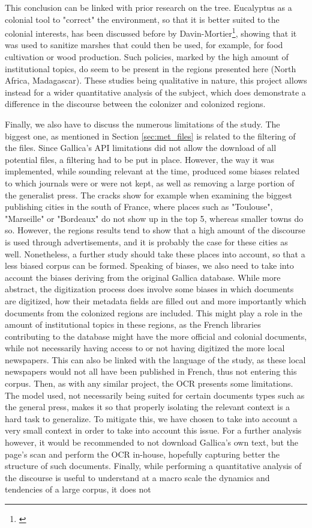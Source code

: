 This conclusion can be linked with prior research on the tree. Eucalyptus as a colonial tool to "correct" the environment, so that it is better suited to the colonial interests, has been discussed before by Davin-Mortier\footnote{\cite[3, 6]{davin-mortier_leucalyptus_2026}}, showing that it was used to sanitize marshes that could then be used, for example, for food cultivation or wood production. Such policies, marked by the high amount of institutional topics, do seem to be present in the regions presented here (North Africa, Madagascar). These studies being qualitative in nature, this project allows instead for a wider quantitative analysis of the subject, which does demonstrate a difference in the discourse between the colonizer and colonized regions. 

Finally, we also have to discuss the numerous limitations of the study. The biggest one, as mentioned in Section \ref{sec:met_files} is related to the filtering of the files. Since Gallica's API limitations did not allow the download of all potential files, a filtering had to be put in place. However, the way it was implemented, while sounding relevant at the time, produced some biases related to which journals were or were not kept, as well as removing a large portion of the generalist press. The cracks show for example when examining the biggest publishing cities in the south of France, where places such as "Toulouse", "Marseille" or "Bordeaux" do not show up in the top 5, whereas smaller towns do so. However, the regions results tend to show that a high amount of the discourse is used through advertisements, and it is probably the case for these cities as well. Nonetheless, a further study should take these places into account, so that a less biased corpus can be formed. Speaking of biases, we also need to take into account the biases deriving from the original Gallica database. While more abstract, the digitization process does involve some biases in which documents are digitized, how their metadata fields are filled out and more importantly which documents from the colonized regions are included. This might play a role in the amount of institutional topics in these regions, as the French libraries contributing to the database might have the more official and colonial documents, while not necessarily having access to or not having digitized the more local newspapers. This can also be linked with the language of the study, as these local newspapers would not all have been published in French, thus not entering this corpus. Then, as with any similar project, the OCR presents some limitations. The model used, not necessarily being suited for certain documents types such as the general press, makes it so that properly isolating the relevant context is a hard task to generalize. To mitigate this, we have chosen to take into account a very small context in order to take into account this issue. For a further analysis however, it would be recommended to not download Gallica's own text, but the page's scan and perform the OCR in-house, hopefully capturing better the structure of such documents. Finally, while performing a quantitative analysis of the discourse is useful to understand at a macro scale the dynamics and tendencies of a large corpus, it does not 